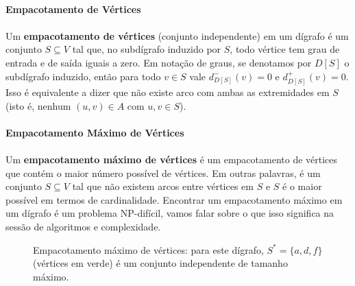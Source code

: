\documentclass[12pt,a4paper]{article}
\def\\{}%
\begin{document}
\paragraph{Empacotamento de Vértices}
\paragraph{}Um \textbf{empacotamento de vértices} (conjunto independente) em um dígrafo é um conjunto \(S\subseteq V\) tal que, no subdígrafo induzido por \(S\), todo vértice tem grau de entrada e de saída iguais a zero. Em notação de graus, se denotamos por \(D[S]\) o subdígrafo induzido, então para todo \(v\in S\) vale \(d^-_{D[S]}(v)=0\) e \(d^+_{D[S]}(v)=0\). Isso é equivalente a dizer que não existe arco com ambas as extremidades em \(S\) (isto é, nenhum \((u,v)\in A\) com \(u,v\in S\)).

\paragraph{Empacotamento Máximo de Vértices}
\paragraph{}
Um \textbf{empacotamento máximo de vértices} é um empacotamento de vértices que contém o maior número possível de vértices. Em outras palavras, é um conjunto \(S\subseteq V\) tal que não existem arcos entre vértices em \(S\) e \(S\) é o maior possível em termos de cardinalidade. Encontrar um empacotamento máximo em um dígrafo é um problema NP-difícil, vamos falar sobre o que isso significa na sessão de algoritmos e complexidade.

\begin{figure}[H]
\centering
{}
\caption{Empacotamento máximo de vértices: para este dígrafo, $S^{*}=\{a,d,f\}$ (vértices em verde) é um conjunto independente de tamanho máximo.}
\label{fig:empacotamento-max}
\end{figure}
\end{document}
